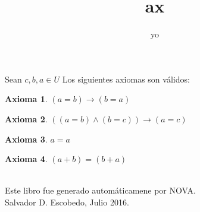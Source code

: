 ﻿\documentclass[12pt]{book}
\title{ax}
\author{yo}
\date{}
\newtheorem{axiom}{Axioma}[chapter]
\begin{document}
\maketitle

Sean $c,b,a\in U$
Los siguientes axiomas son válidos: 
\begin{axiom}
\item $(a=b)\rightarrow (b=a)$
\end{axiom}
\begin{axiom}
\item $((a=b)\wedge (b=c))\rightarrow (a=c)$
\end{axiom}
\begin{axiom}
\item $a=a$
\end{axiom}
\begin{axiom}
\item $(a+b)=(b+a)$
\end{axiom}
\label{ax: 0}
\\\small{Este libro fue generado automáticamene por NOVA.} \\
\small{Salvador D. Escobedo, Julio 2016}.
\end{document}
